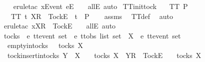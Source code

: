 \begin{isabellebody}
\ \ \isamarkupfalse%
\ {\isacharparenleft}erule{\isacharunderscore}tac\ x{\isacharequal}{\isachardoublequoteopen}{\isacharbrackleft}Event\ e{\isacharbrackright}\isactrlsub E\ {\isacharhash}\ {\isasymrho}{\isachardoublequoteclose}\ \ allE{\isacharcomma}\ auto{\isacharparenright}%
\endisatagproof
{\isafoldproof}%
%
\isadelimproof
\isanewline
%
\endisadelimproof
\isanewline
{}\isamarkupfalse%
\ TT{}{\isacharunderscore}init{\isacharunderscore}tock{\isacharcolon}\isanewline
\ \ \ {\isachardoublequoteopen}TT{}\ P{\isachardoublequoteclose}\isanewline
\ \ \ {\isachardoublequoteopen}TT{}\ {\isacharbraceleft}t{\isachardot}\ {\isacharbrackleft}X{\isacharbrackright}\isactrlsub R\ {\isacharhash}\ {\isacharbrackleft}Tock{\isacharbrackright}\isactrlsub E\ {\isacharhash}\ t\ {\isasymin}\ P{\isacharbraceright}{\isachardoublequoteclose}\isanewline
%
\isadelimproof
\ \ %
\endisadelimproof
%
\isatagproof
{}\isamarkupfalse%
\ assms\ \isamarkupfalse%
\ TT{}{\isacharunderscore}def\ \isamarkupfalse%
\ {\isacharparenleft}auto{\isacharparenright}\isanewline
\ \ \isamarkupfalse%
\ {\isacharparenleft}erule{\isacharunderscore}tac\ x{\isacharequal}{\isachardoublequoteopen}{\isacharbrackleft}X{\isacharbrackright}\isactrlsub R\ {\isacharhash}\ {\isacharbrackleft}Tock{\isacharbrackright}\isactrlsub E\ {\isacharhash}\ {\isasymrho}{\isachardoublequoteclose}\ \ allE{\isacharcomma}\ auto{\isacharparenright}%
\endisatagproof
{\isafoldproof}%
%
\isadelimproof
%
\endisadelimproof
%
\isadelimdocument
%
\endisadelimdocument
%
\isatagdocument
%
\isamarkuptrue%
%
\endisatagdocument
{\isafolddocument}%
%
\isadelimdocument
%
\endisadelimdocument
{}\isamarkupfalse%
\ tocks\ {\isacharcolon}{\isacharcolon}\ {\isachardoublequoteopen}{\isacharprime}e\ ttevent\ set\ {\isasymRightarrow}\ {\isacharprime}e\ ttobs\ list\ set{\isachardoublequoteclose}\ \ X\ {\isacharcolon}{\isacharcolon}\ {\isachardoublequoteopen}{\isacharprime}e\ ttevent\ set{\isachardoublequoteclose}\ \isanewline
\ \ empty{\isacharunderscore}in{\isacharunderscore}tocks{\isacharcolon}\ {\isachardoublequoteopen}{\isacharbrackleft}{\isacharbrackright}\ {\isasymin}\ tocks\ X{\isachardoublequoteclose}\ {\isacharbar}\isanewline
\ \ tock{\isacharunderscore}insert{\isacharunderscore}in{\isacharunderscore}tocks{\isacharcolon}\ {\isachardoublequoteopen}Y\ {\isasymsubseteq}\ X\ {\isasymLongrightarrow}\ {\isasymrho}\ {\isasymin}\ tocks\ X\ {\isasymLongrightarrow}\ {\isacharbrackleft}Y{\isacharbrackright}\isactrlsub R\ {\isacharhash}\ {\isacharbrackleft}Tock{\isacharbrackright}\isactrlsub E\ {\isacharhash}\ {\isasymrho}\ {\isasymin}\ tocks\ X{\isachardoublequoteclose}\isanewline

\end{isabellebody}
